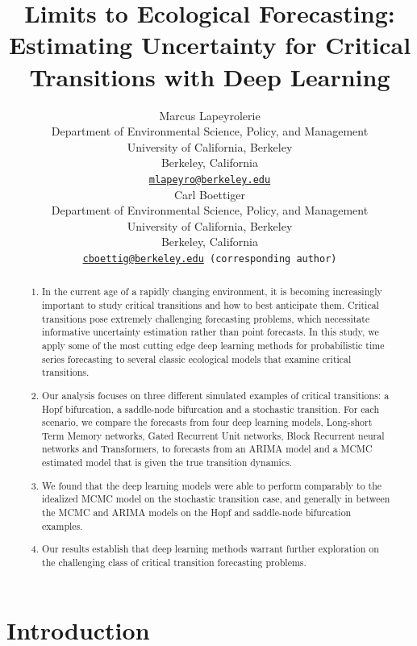 \documentclass{article}
\title{Limits to Ecological Forecasting: Estimating Uncertainty for
Critical Transitions with Deep Learning}
\author{
    Marcus Lapeyrolerie
   \\
    Department of Environmental Science, Policy, and Management \\
    University of California, Berkeley \\
  Berkeley, California \\
  \texttt{\href{mailto:mlapeyro@berkeley.edu}{\nolinkurl{mlapeyro@berkeley.edu}}} \\
   \And
    Carl Boettiger
   \\
    Department of Environmental Science, Policy, and Management \\
    University of California, Berkeley \\
  Berkeley, California \\
  \texttt{\href{mailto:cboettig@berkeley.edu}{\nolinkurl{cboettig@berkeley.edu}}
(corresponding author)} \\
  }
\providecommand{\tightlist}{%
  \setlength{\itemsep}{0pt}\setlength{\parskip}{0pt}}
\begin{document}
\maketitle


\begin{abstract}
\begin{enumerate}
\def\labelenumi{\arabic{enumi}.}
\tightlist
\item
  In the current age of a rapidly changing environment, it is becoming
  increasingly important to study critical transitions and how to best
  anticipate them. Critical transitions pose extremely challenging
  forecasting problems, which necessitate informative uncertainty
  estimation rather than point forecasts. In this study, we apply some
  of the most cutting edge deep learning methods for probabilistic time
  series forecasting to several classic ecological models that examine
  critical transitions.
\item
  Our analysis focuses on three different simulated examples of critical
  transitions: a Hopf bifurcation, a saddle-node bifurcation and a
  stochastic transition. For each scenario, we compare the forecasts
  from four deep learning models, Long-short Term Memory networks, Gated
  Recurrent Unit networks, Block Recurrent neural networks and
  Transformers, to forecasts from an ARIMA model and a MCMC estimated
  model that is given the true transition dynamics.
\item
  We found that the deep learning models were able to perform comparably
  to the idealized MCMC model on the stochastic transition case, and
  generally in between the MCMC and ARIMA models on the Hopf and
  saddle-node bifurcation examples.
\item
  Our results establish that deep learning methods warrant further
  exploration on the challenging class of critical transition
  forecasting problems.
\end{enumerate}
\end{abstract}


\hypertarget{introduction}{%
\section{Introduction}\label{introduction}}
\end{document}
